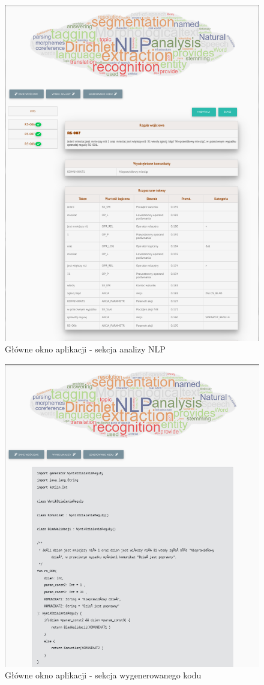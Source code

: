 \begin{figure}[H]
	\centering
	\includegraphics[scale=0.7]{img/app/app-reg.png}
	\caption{Główne okno aplikacji - sekcja analizy NLP}\label{visina8}
\end{figure}

\begin{figure}[H]
	\centering
	\includegraphics[scale=0.7]{img/app/app-kod.png}
	\caption{Główne okno aplikacji - sekcja wygenerowanego kodu}\label{visina8}
\end{figure}